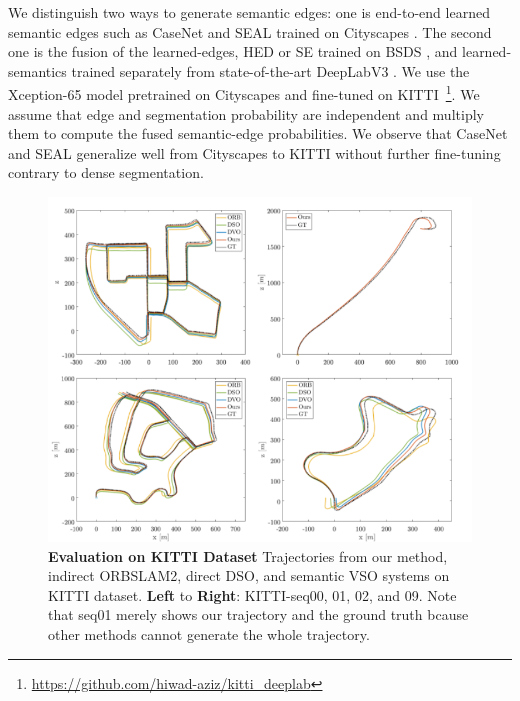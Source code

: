 We distinguish two ways to generate semantic edges: one is end-to-end learned
semantic edges such as CaseNet and SEAL trained on Cityscapes \cite{cordts2016cityscapes}. 
The second one is the fusion of the learned-edges, HED or SE trained on BSDS \cite{arbelaez2011contour}, and learned-semantics trained separately from state-of-the-art DeepLabV3 \cite{deeplabv3plus2018}.  We use the Xception-65 \cite{chollet2017xception} model pretrained on Cityscapes and fine-tuned on KITTI~\footnote{\url{https://github.com/hiwad-aziz/kitti\_deeplab}}. 
We assume that edge and segmentation probability are independent and multiply them to compute the fused semantic-edge probabilities.
We observe that CaseNet and SEAL generalize well from Cityscapes to KITTI without further fine-tuning contrary to dense segmentation. 

\begin{figure}[t]
  	\centering
  	\includegraphics[width=0.8\linewidth]{figures/illumination/semantics_trajectory_kitti.pdf}
 	\caption[Evaluation on KITTI Dataset]{ \textbf{Evaluation on KITTI Dataset} Trajectories from our method, indirect ORBSLAM2, direct DSO, and semantic VSO systems on KITTI dataset. \textbf{Left} to \textbf{Right}: KITTI-seq00, 01, 02, and 09. Note that seq01 merely shows our trajectory and the ground truth bcause other methods cannot generate the whole trajectory. 
  	\label{fig:semantics_trajectory}}
\end{figure}

